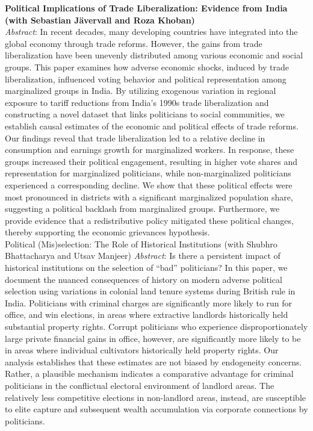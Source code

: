 \documentclass[11pt]{article}
\newcommand{\schoolwithcourses}[4]{
 \textbf{#1} \hfill{#2}\\
    #3\\
\vspace*{5pt}
}
\begin{document}
\schoolwithcourses{Political Implications of Trade Liberalization: Evidence from India \textnormal{(with Sebastian J\"{a}vervall and Roza Khoban)}}{}{\vspace{2mm} \textit{Abstract}: In recent decades, many developing countries have integrated into the global economy through trade reforms. However, the gains from trade liberalization have been unevenly distributed among various economic and social groups. This paper examines how adverse economic shocks, induced by trade liberalization, influenced voting behavior and political representation among marginalized groups in India. By utilizing exogenous variation in regional exposure to tariff reductions from India’s 1990s trade liberalization and constructing a novel dataset that links politicians to social communities, we establish causal estimates of the economic and political effects of trade reforms. Our findings reveal that trade liberalization led to a relative decline in consumption and earnings growth for marginalized workers. In response, these groups increased their political engagement, resulting in higher vote shares and representation for marginalized politicians, while non-marginalized politicians experienced a corresponding decline. We show that these political effects were most pronounced in districts with a significant marginalized population share, suggesting a political backlash from marginalized groups. Furthermore, we provide evidence that a redistributive policy mitigated these political changes, thereby supporting the economic grievances hypothesis.}

\schoolwithcourses{Political (Mis)selection: The Role of Historical Institutions \textnormal{(with Shubhro Bhattacharya and Utsav Manjeer)}}{}{\vspace{2mm} \textit{Abstract}: Is there a persistent impact of historical institutions on the selection of ``bad'' politicians? In this paper, we document the nuanced consequences of history on modern adverse political selection using variations in colonial land tenure systems during British rule in India. Politicians with criminal charges are significantly more likely to run for office, and win elections, in areas where extractive landlords historically held substantial property rights. Corrupt politicians who experience disproportionately large private financial gains in office, however, are significantly more likely to be in areas where individual cultivators historically held property rights. Our analysis establishes that these estimates are not biased by endogeneity concerns. Rather, a plausible mechanism indicates a comparative advantage for criminal politicians in the conflictual electoral environment of landlord areas. The relatively less competitive elections in non-landlord areas, instead, are susceptible to elite capture and subsequent wealth accumulation via corporate connections by politicians.}  
\end{document}
